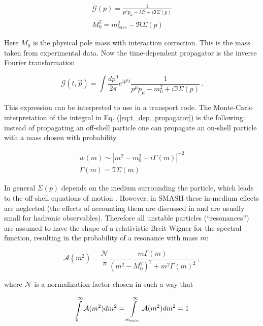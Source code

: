 \begin{align}
  \mathcal{G}(p) = \frac{1}{p^{\mu}p_{\mu} - M_0^2 + i \Im{\Sigma(p)}} \\
  M_0^2 = m_{bare}^2 - \Re{\Sigma(p)}
\end{align}

Here $M_0$ is the physical pole mass with interaction correction. This is the
mass taken from experimental data. Now the time-dependent propagator is
the inverse Fourier transformation

\begin{equation} \label{eq:t_dep_propagator}
  \mathcal{G}(t,\vec{p}) = \int \frac{d p^0}{2\pi} e^{i p^0 t}
    \frac{1}{p^{\mu}p_{\mu} - m_0^2 + i \Im{\Sigma(p)}} \,.
\end{equation}

This expression can be interpreted to use in a transport code. The Monte-Carlo
interpretation of the integral in Eq. (\ref{eq:t_dep_propagator}) is the
following: instead of propagating an off-shell particle one can propagate an
on-shell particle with a mass chosen with probability

\begin{align}
  w(m) \sim |m^2 - m_0^2 + i \Gamma(m)|^{-2} \\
  \Gamma(m) = \Im{\Sigma(m)}
\end{align}

In general $\Sigma(p)$ depends on the medium surrounding the particle, which
leads to the off-shell equations of motion \cite{Cassing:2009vt}. However, in
SMASH these in-medium effects are neglected (the effects of accounting them are
discussed in \cite{Cassing:1999mh} and are usually small for hadronic observables).
Therefore all unstable particles
(``resonances'') are assumed to have the shape of a relativistic Breit-Wigner for the
spectral function, resulting in the probability of a resonance with mass $m$:

\begin{equation}
  \mathcal{A}(m^2) = \frac{\mathcal{N}}{\pi} \frac{m \Gamma(m)}{(m^2 - M_0^2)^2 + m^2 \Gamma(m)^2} \,,
\end{equation}

where $\mathcal{N}$ is a normalization factor chosen in such a way that

\begin{equation}
  \int\displaylimits_0^\infty \mathcal{A}(m^2)dm^2 =
  \int\displaylimits_{m_{\textrm min}}^\infty \mathcal{A}(m^2)dm^2 = 1
\end{equation}


